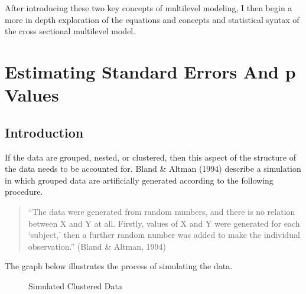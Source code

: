 \documentclass[
  letterpaper,
  DIV=11,
  numbers=noendperiod]{scrreprt}
\begin{document}
After introducing these two key concepts of multilevel modeling, I then
begin a more in depth exploration of the equations and concepts and
statistical syntax of the cross sectional multilevel model.

\section{Estimating Standard Errors And p Values}\label{sec-pvalues}

\subsection{Introduction}\label{introduction-1}

If the data are grouped, nested, or clustered, then this aspect of the
structure of the data needs to be accounted for. Bland \& Altman (1994)
describe a simulation in which grouped data are artificially generated
according to the following procedure.

\begin{quote}
``The data were generated from random numbers, and there is no relation
between X and Y at all. Firstly, values of X and Y were generated for
each `subject,' then a further random number was added to make the
individual observation.'' (Bland \& Altman, 1994)
\end{quote}

The graph below illustrates the process of simulating the data.

\begin{figure}


\caption{\label{fig-simulatedclustereddata}Simulated Clustered Data}

\end{figure}%
\end{document}
